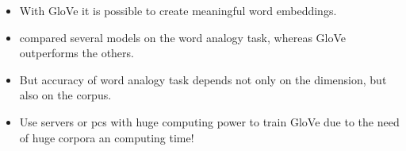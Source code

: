 \begin{itemize}
  \item 
    With GloVe it is possible to create meaningful word embeddings.

  \item 
    \cite{pennington2014glove} compared several models on the word analogy task, 
    whereas GloVe outperforms the others.
  
  \item 
    But accuracy of word analogy task depends not only on the dimension, but 
    also on the corpus.

  \item 
    Use servers or pcs with huge computing power to train GloVe due to 
    the need of huge corpora an computing time!
\end{itemize}